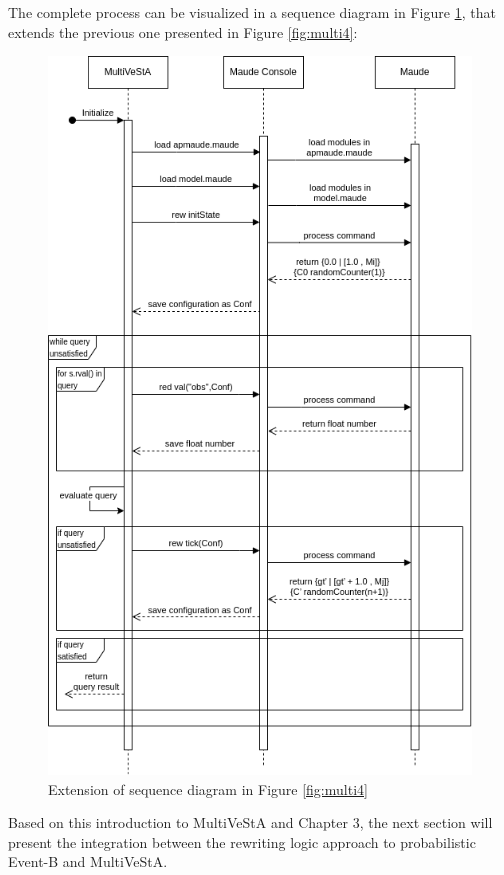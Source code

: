 The complete process can be visualized in a sequence diagram in Figure \ref{fig:multi5}, that extends the previous one presented in Figure \ref{fig:multi4}:

\begin{figure}[H]
    \centering
    \includegraphics[scale = 0.5]{images/multi5.png}
    \caption{Extension of sequence diagram in Figure \ref{fig:multi4}}
    \label{fig:multi5}
\end{figure}

Based on this introduction to MultiVeStA and Chapter 3, the next section will present the integration between the rewriting logic approach to probabilistic Event-B and MultiVeStA.


